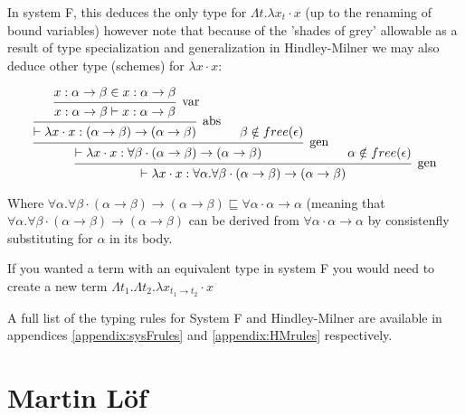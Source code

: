 \documentclass{ProgressReport}[2020/09/15]
\begin{document}
            In system F, this deduces the only type for $\Lambda t . \lambda x_t
            \cdot x$ (up to the renaming of bound variables) however note that
            because of the 'shades of grey' allowable as a result of type
            specialization and generalization in Hindley-Milner we may
            also deduce other type (schemes) for $\lambda x \cdot x$:
            
            \[\begin{array}{c}
            \mbox{\begin{prooftree}
                        \hypo{x : \alpha \to \beta \in x : \alpha \to \beta}
                    \infer1[var]{x : \alpha \to \beta \vdash x : \alpha \to \beta}   
                    \infer1[abs]{\vdash \lambda x \cdot x : (\alpha \to \beta) \to
                    (\alpha \to \beta)}
                    \hypo{\beta \notin free(\epsilon)}        
                \infer2[gen]{\vdash \lambda x \cdot x : \forall \beta \cdot
                  (\alpha \to \beta) \to (\alpha \to \beta)}
                \hypo{\alpha \notin free(\epsilon)}
               \infer2[gen]{\vdash \lambda x \cdot x : \forall \alpha . \forall
                 \beta \cdot (\alpha \to \beta) \to (\alpha \to \beta)}
            \end{prooftree}}
            \end{array} \]
            
            Where $\forall \alpha . \forall \beta \cdot
            (\alpha \to \beta) \to (\alpha \to \beta) \sqsubseteq \forall \alpha \cdot
               \alpha \to \alpha$ (meaning that $\forall \alpha . \forall \beta \cdot
            (\alpha \to \beta) \to (\alpha \to \beta)$ can be derived
               from $\forall \alpha \cdot \alpha \to \alpha$ by
               consistenfly substituting for $\alpha$ in its body.
            
            If you wanted a term with an equivalent type in system F you would
            need to create a new term $\Lambda t_1 . \Lambda t_2 . \lambda x_{t_1
              \to t_2} \cdot x$
            
            A full list of the typing rules for System F and Hindley-Milner are
            available in appendices \ref{appendix:sysFrules} and
            \ref{appendix:HMrules} respectively.
                    
          \section{Martin L\"{o}f}
            
\end{document}
